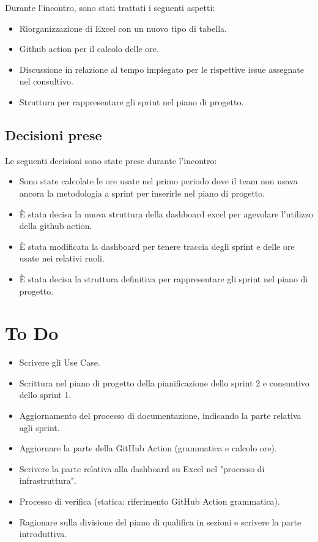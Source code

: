 \documentclass[a4paper, 12pt]{article}
\begin{document}
Durante l'incontro, sono stati trattati i seguenti aspetti:
\begin{itemize}
    \item Riorganizzazione di Excel con un nuovo tipo di tabella.
    \item Github action per il calcolo delle ore.
    \item Discussione in relazione al tempo impiegato per le rispettive issue assegnate nel consultivo.
    \item Struttura per rappresentare gli sprint nel piano di progetto.
\end{itemize}

\subsection{Decisioni prese}

Le seguenti decisioni sono state prese durante l'incontro:
\begin{itemize}
    \item Sono state calcolate le ore usate nel primo periodo dove il team non usava ancora la metodologia a sprint per inserirle nel piano di progetto.
    \item È stata decisa la nuova struttura della dashboard excel per agevolare l'utilizzo della github action.
    \item È stata modificata la dashboard per tenere traccia degli sprint e delle ore usate nei relativi ruoli.
    \item È stata decisa la struttura definitiva per rappresentare gli sprint nel piano di progetto.
\end{itemize}

\section{To Do}
\begin{itemize}
    \item Scrivere gli Use Case.
    \item Scrittura nel piano di progetto della pianificazione dello sprint 2 e consuntivo dello sprint 1.
    \item Aggiornamento del processo di documentazione, indicando la parte relativa agli sprint.
    \item Aggiornare la parte della GitHub Action (grammatica e calcolo ore).
    \item Scrivere la parte relativa alla dashboard su Excel nel "processo di infrastruttura".
    \item Processo di verifica (statica: riferimento GitHub Action grammatica).
    \item Ragionare sulla divisione del piano di qualifica in sezioni e scrivere la parte introduttiva.
\end{itemize}
\end{document}
